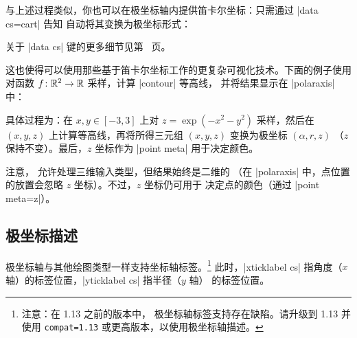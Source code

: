{与上述过程类似，你也可以在极坐标轴内提供笛卡尔坐标：只需通过 |data cs=cart|
告知 \PGFPlots{} 自动将其变换为极坐标形式：
%
\begin{codeexample}[]
\end{codeexample}
%
\noindent 关于 |data cs| 键的更多细节见第~\pageref{key:data:cs} 页。

这也使得可以使用那些基于笛卡尔坐标工作的更复杂可视化技术。下面的例子使用
 对函数 $f\colon \mathbb{R}^2 \to \mathbb{R}$ 采样，计算 |contour| 等高线，
并将结果显示在 |polaraxis| 中：
%
\pgfplotsexpensiveexample
\begin{codeexample}[]
\end{codeexample}
%
\noindent 具体过程为：在 $x,y \in [-3,3]$ 上对 $z=\exp(-x^2-y^2)$ 采样，然后在
$(x,y,z)$ 上计算等高线，再将所得三元组 $(x,y,z)$ 变换为极坐标 $(\alpha,r,z)$
（$z$ 保持不变）。最后，$z$ 坐标作为 |point meta| 用于决定颜色。

注意， 允许处理三维输入类型，但结果始终是二维的
（在 |polaraxis| 中，点位置的放置会忽略 $z$ 坐标）。不过，$z$ 坐标仍可用于
决定点的颜色（通过 |point meta=z|）。


\subsection{极坐标描述}

极坐标轴与其他绘图类型一样支持坐标轴标签。\footnote{注意：在 1.13 之前的版本中，
极坐标轴标签支持存在缺陷。请升级到 \PGFPlots{} 1.13 并使用
\texttt{compat=1.13} 或更高版本，以使用极坐标轴描述。}
此时，|xticklabel cs| 指角度（$x$ 轴）的标签位置，|yticklabel cs| 指半径（$y$ 轴）
的标签位置。

}
